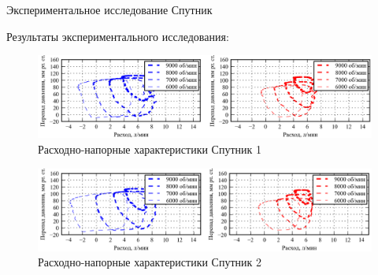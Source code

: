 \documentclass[a4paper, 9pt]{beamer}
\begin{document}
\begin{frame}{Экспериментальное исследование Спутник}
\begin{minipage}[ht]{0.49\textwidth}
\vskip3pt
Результаты экспериментального исследования: 
\vskip-14pt
\begin{figure}
  \center
  \includegraphics[scale=0.35]{../images/hq_s1_pres}
  \vskip-8pt\caption{\tiny Расходно-напорные характеристики Спутник 1} 
\end{figure}
\vskip-20pt
\begin{figure}
  \center
  \includegraphics[scale=0.35]{../images/hq_s2_pres}
  \vskip-8pt\caption{\tiny Расходно-напорные характеристики Спутник 2} 
\end{figure}
\vskip-20pt
\begin{figure}

\end{figure}
\end{minipage}
\end{frame}
\end{document}
